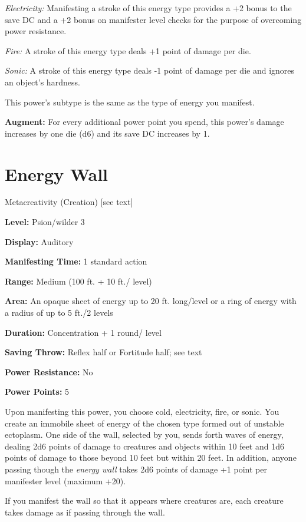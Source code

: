 \documentclass{article}
\begin{document}
\textit{Electricity: }Manifesting a stroke of this energy type provides a +2 bonus 
to the save DC and a +2 bonus on manifester level checks for the purpose of overcoming 
power resistance.

\textit{Fire: }A stroke of this energy type deals +1 point of damage per die.

\textit{Sonic: }A stroke of this energy type deals -1 point of damage per die and 
ignores an object's hardness.

This power's subtype is the same as the type of energy you manifest.

\textbf{Augment:} For every additional power point you spend, this power's damage 
increases by one die (d6) and its save DC increases by 1.

\vspace{12pt}
\section*{Energy Wall}

Metacreativity (Creation) [see text]

\textbf{Level:} Psion/wilder 3

\textbf{Display:} Auditory

\textbf{Manifesting Time:} 1 standard action

\textbf{Range:} Medium (100 ft. + 10 ft./ level)

\textbf{Area:} An opaque sheet of energy up to 20 ft. long/level or a ring of energy 
with a radius of up to 5 ft./2 levels

\textbf{Duration:} Concentration + 1 round/ level

\textbf{Saving Throw:} Reflex half or Fortitude half; see text

\textbf{Power Resistance:} No

\textbf{Power Points:} 5

Upon manifesting this power, you choose cold, electricity, fire, or sonic. You 
create an immobile sheet of energy of the chosen type formed out of unstable ectoplasm. 
One side of the wall, selected by you, sends forth waves of energy, dealing 2d6 
points of damage to creatures and objects within 10 feet and 1d6 points of damage 
to those beyond 10 feet but within 20 feet. In addition, anyone passing though 
the \textit{energy wall }takes 2d6 points of damage +1 point per manifester level 
(maximum +20).

If you manifest the wall so that it appears where creatures are, each creature 
takes damage as if passing through the wall.
\end{document}
